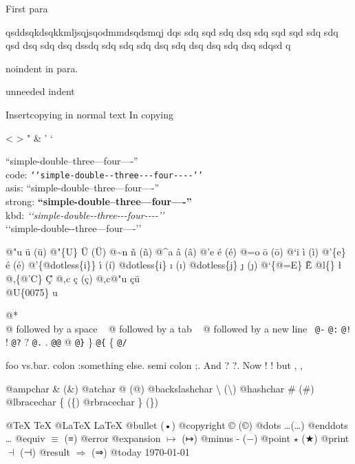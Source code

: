 \documentclass{book}
\newcommand\Texinfocommandstyletextkbd[1]{{\ttfamily\textsl{#1}}}%
\renewcommand{\_}{\Texinfounderscore\discretionary{}{}{}}
\begin{document}
First para

\noindent{}qsddsqkdsqkkmljsqjsqodmmdsqdsmqj dqs sdq sqd sdq dsq sdq sqd sqd sdq sdq 
qsd dsq sdq dsq dssdq sdq sdq sdq dsq sdq dsq dsq sdq dsq sdqsd q

\noindent{}noindent in para.

unneeded indent

Insertcopying in normal text
In copying

<
>
"
\&
'
`

``simple-double--three---four----''\leavevmode{}\\
code: \texttt{{`}{`}simple-double{-}{-}three{-}{-}{-}four{-}{-}{-}-{'}{'}} \leavevmode{}\\
asis: ``simple-double--three---four----'' \leavevmode{}\\
strong: \textbf{``simple-double--three---four----''} \leavevmode{}\\
kbd: \Texinfocommandstyletextkbd{{`}{`}simple-double{-}{-}three{-}{-}{-}four{-}{-}{-}-{'}{'}} \leavevmode{}\\

`\hbox{}`simple-double-\hbox{}-three---four----'\hbox{}'\leavevmode{}\\

%
%
%
%

@"u \"{u} (ü)
@"\{U\} \"{U} (Ü) 
@\~{}n \~{n} (ñ)
@\^{}a \^{a} (â)
@'e \'{e} (é)
@=o \={o} (ō)
@`i \`{i} (ì)
@'\{e\} \'{e} (é)
@'\{@dotless\{i\}\} \'{\i{}} (í)
@dotless\{i\} \i{} (ı)
@dotless\{j\} \j{} (ȷ)
@`\{@=E\} \`{\={E}}
@l\{\} \l{}
@,\{@'C\} \c{\'{C}}
@,c \c{c} (ç)
@,c@"u \c{c}\"{u} \leavevmode{}\\

@U\{0075\} u

@* \leavevmode{}\\
@ followed by a space
\ {}
@ followed by a tab
\ {}
@ followed by a new line
\ {}\texttt{@-} \-{}
\texttt{@:} \@
\texttt{@!} \@!
\texttt{@?} \@?
\texttt{@.} \@.
\texttt{@@} @
\texttt{@\}} \}
\texttt{@\{} \{
\texttt{@/} 

foo vs.\@ bar. 
colon :\@And something else.
semi colon ;\@.
And ? ?\@.
Now ! !\@@
but , ,\@

@ampchar \& (\&)
@atchar @ (@)
@backslashchar \textbackslash{} (\textbackslash{})
@hashchar \# (\#)
@lbracechar \{ (\{)
@rbracechar \} (\})

@TeX \TeX{}
@LaTeX \LaTeX{}
@bullet \textbullet{} (•)
@copyright \copyright{} (©)
@dots \dots{}\@ (…)
@enddots \dots{}
@equiv $\equiv{}$ (≡)
@error 
@expansion $\mapsto{}$ (↦)
@minus - (−)
@point $\star{}$ (★)
@print $\dashv{}$ (⊣)
@result $\Rightarrow{}$ (⇒)
@today \today{}
\end{document}
